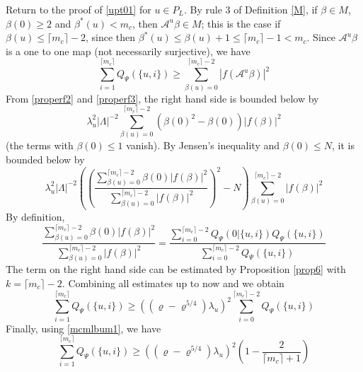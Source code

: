 \documentclass[11pt]{article}
\numberwithin{equation}{section}
\newcommand{\beq}{\begin{equation}}
\newcommand{\eeq}{\end{equation}}
\newcommand\be{\beta}
\renewcommand\rho\varrho
\theoremstyle{definition}
\begin{document}
Return to the proof of \eqref{upt01} for $u\in P_L$. By rule 3 of Definition \ref{M}, if $\be\in M$, $\be(0)\geq2$ and $\be^*(u)<m_c$, then $\mathcal A^{u}\be\in M$; this is the case if $\be(u)\leq\lceil m_c\rceil-2$, since then $\be^*(u)\leq\be(u)+1\leq\lceil m_c\rceil-1<m_c$. Since $\mathcal A^{u}\beta$ is a one to one map 
(not necessarily surjective), we have 
\beq\label{lastlb2.1}
\sum_{i=1}^{\lceil m_c\rceil} Q_\Psi(\{u,i\}) \ge \sum_{\be(u)=0}^{\lceil m_c\rceil-2}
|f(\mathcal A^{u}\beta)|^2 
\eeq
{F}rom \eqref{properf2} and \eqref{properf3}, the right hand side is bounded below by 
\beq\label{lastlb2}
\lambda_u^2|\Lambda|^{-2}\sum_{\be(u)=0}^{\lceil m_c\rceil-2}
\left(\be(0)^2-\be(0)\right)|f(\be)|^2
\eeq
(the terms with $\be(0)\leq 1$ vanish). By Jensen's inequality and $\be(0)\leq N$, it is bounded below by 
\beq\label{lastlb3}
\lambda_u^2|\Lambda|^{-2}\left(\left(\frac{\sum_{\be(u)=0}^{\lceil m_c\rceil-2}
\be(0)|f(\be)|^2}{\sum_{\be(u)=0}^{\lceil m_c\rceil-2}
|f(\be)|^2}\right)^2-N\right)\sum_{\be(u)=0}^{\lceil m_c\rceil-2}
|f(\be)|^2
\eeq
By definition, 
\beq\label{temp6.49}
\frac{\sum_{\be(u)=0}^{\lceil m_c\rceil-2}
\be(0)|f(\be)|^2}{\sum_{\be(u)=0}^{\lceil m_c\rceil-2}
|f(\be)|^2}=\frac{\sum_{i=0}^{\lceil m_c\rceil-2}Q_\Psi(0 | \{u,i\}) Q_\Psi(\{u,i\})}{\sum_{i=0}^{\lceil m_c\rceil-2} Q_\Psi(\{u,i\})}
\eeq
The term on the right hand side can be estimated by  Proposition \ref{prop6} with $k=\lceil m_c\rceil-2$. Combining all estimates 
up to now and  we obtain 
\beq
\sum_{i=1}^{\lceil m_c\rceil} Q_\Psi(\{u,i\})\geq ((\rho-\rho^{5/4})\lambda_u)^{2}\sum_{i=0}^{\lceil m_c\rceil-2} Q_\Psi(\{u,i\})
\eeq
Finally, using \eqref{mcmlbum1}, we have
\beq
\sum_{i=1}^{\lceil m_c\rceil} Q_\Psi(\{u,i\})\geq  ((\rho-\rho^{5/4})\lambda_u)^{2}\left(1-\frac{2}{\lceil m_c\rceil+1}\right)
\eeq
\end{document}
